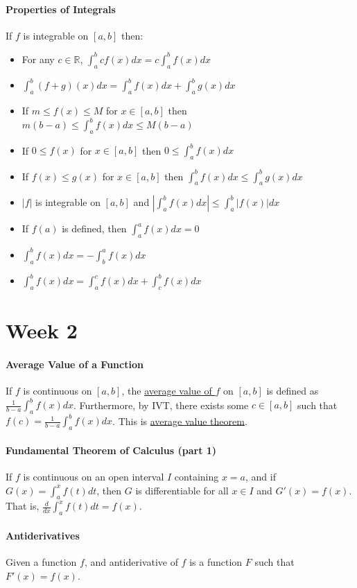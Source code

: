 \documentclass[10pt,letter]{article}
\begin{document}
\paragraph{Properties of Integrals} If $f$ is integrable on $[a,b]$ then: \begin{itemize}
    \item For any $c\in\mathbb{R}$, $\int_a^bcf(x)dx=c\int_a^bf(x)dx$
    \item $\int_a^b(f+g)(x)dx = \int_a^bf(x)dx + \int_a^bg(x)dx$
    \item If $m\leq f(x)\leq M$ for $x\in[a,b]$ then $m(b-a)\leq \int_a^bf(x)dx\leq M(b-a)$ 
    \item If $0\leq f(x)$ for $x\in[a,b]$ then $0\leq \int_a^bf(x)dx$ 
    \item If $f(x)\leq g(x)$ for $x\in[a,b]$ then $\int_a^bf(x)dx\leq\int_a^bg(x)dx$
    \item $|f|$ is integrable on $[a,b]$ and $\left|\int_a^bf(x)dx\right|\leq \int_a^b|f(x)|dx$ 
    \item If $f(a)$ is defined, then $\int_a^af(x)dx=0$ 
    \item $\int_a^bf(x)dx=-\int_b^af(x)dx$ 
    \item $\int_a^bf(x)dx=\int_a^cf(x)dx+\int_c^bf(x)dx$ 
\end{itemize}

\pagebreak

\section*{Week 2}
\paragraph{Average Value of a Function} If $f$ is continuous on $[a,b]$, the \underline{average value of $f$} on $[a,b]$ is defined as $\frac{1}{b-a}\int_a^bf(x)dx$. Furthermore, by IVT, there exists some $c\in[a,b]$ such that $f(c)=\frac{1}{b-a}\int_a^bf(x)dx$. This is \underline{average value theorem}. 

\paragraph{Fundamental Theorem of Calculus (part 1)} If $f$ is continuous on an open interval $I$ containing $x=a$, and if $G(x)=\int_a^xf(t)dt$, then $G$ is differentiable for all $x\in I$ and $G'(x)=f(x)$. That is, $\frac{d}{dx}\int_a^xf(t)dt=f(x)$. 

\paragraph{Antiderivatives} Given a function $f$, and antiderivative of $f$ is a function $F$ such that $F'(x)=f(x)$. 
\end{document}
